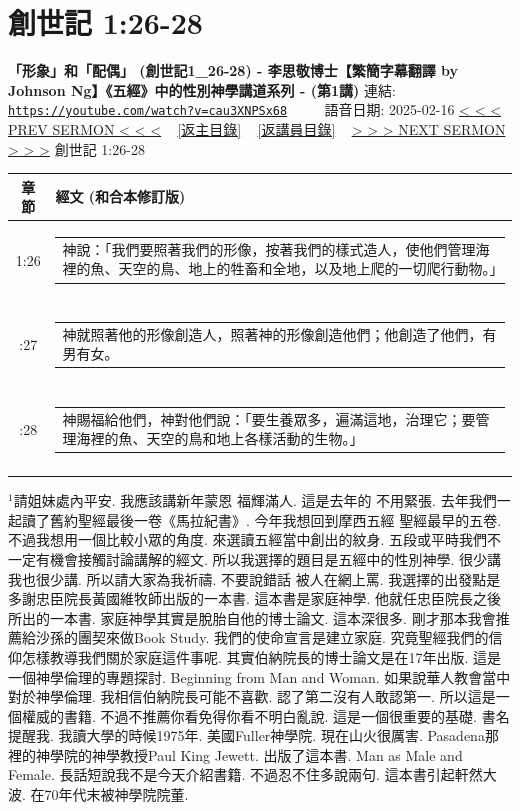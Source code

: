 \documentclass{book}
\begin{document}
\section{創世記 1:26-28}
\label{sec:cau3XNPSx68}
\textbf{「形象」和「配偶」 (創世記1\_26-28) - 李思敬博士【繁簡字幕翻譯 by Johnson Ng】《五經》中的性別神學講道系列 - (第1講)}
\newline
\newline
連結: \href{https://youtube.com/watch?v=cau3XNPSx68}{\texttt{https://youtube.com/watch?v=cau3XNPSx68}} ~~~~ 語音日期: 2025-02-16
\newline
\newline
\hyperref[sec:l7wNnYvML2Y]{< < < PREV SERMON < < <}
~
\hyperlink{toc}{[返主目錄]}
~
\hyperref[ch:preacher5]{[返講員目錄]}
~
\hyperref[sec:dX_CJYSfYFI]{> > > NEXT SERMON > > >}
\newline
\newline
創世記 1:26-28
\newline
\begin{longtable}{cl}
\hline
\hline
章節 & 經文 (和合本修訂版)\\
\hline
1:26 & \begin{tabularx}{0.7\textwidth}{X} 神說：「我們要照著我們的形像，按著我們的樣式造人，使他們管理海裡的魚、天空的鳥、地上的牲畜和全地，以及地上爬的一切爬行動物。」 \end{tabularx} \\ \\ \relax
1:27 & \begin{tabularx}{0.7\textwidth}{X} 神就照著他的形像創造人，照著神的形像創造他們；他創造了他們，有男有女。 \end{tabularx} \\ \\ \relax
1:28 & \begin{tabularx}{0.7\textwidth}{X} 神賜福給他們，神對他們說：「要生養眾多，遍滿這地，治理它；要管理海裡的魚、天空的鳥和地上各樣活動的生物。」 \end{tabularx} \\ \\
[1ex]
\hline
\hline
\end{longtable}
$^{1}$請姐妹處內平安.
我應該講新年蒙恩 福輝滿人.
這是去年的 不用緊張.
去年我們一起讀了舊約聖經最後一卷《馬拉紀書》.
今年我想回到摩西五經 聖經最早的五卷.
不過我想用一個比較小眾的角度.
來選讀五經當中創出的紋身.
五段或平時我們不一定有機會接觸討論講解的經文.
所以我選擇的題目是五經中的性別神學.
很少講 我也很少講.
所以請大家為我祈禱.
不要說錯話 被人在網上罵.
我選擇的出發點是多謝忠臣院長黃國維牧師出版的一本書.
這本書是家庭神學.
他就任忠臣院長之後所出的一本書.
家庭神學其實是脫胎自他的博士論文.
這本深很多.
剛才那本我會推薦給沙孫的團契來做Book Study.
我們的使命宣言是建立家庭.
究竟聖經我們的信仰怎樣教導我們關於家庭這件事呢.
其實伯納院長的博士論文是在17年出版.
這是一個神學倫理的專題探討.
Beginning from Man and Woman.
如果說華人教會當中對於神學倫理.
我相信伯納院長可能不喜歡.
認了第二沒有人敢認第一.
所以這是一個權威的書籍.
不過不推薦你看免得你看不明白亂說.
這是一個很重要的基礎.
書名提醒我.
我讀大學的時候1975年.
美國Fuller神學院.
現在山火很厲害.
Pasadena那裡的神學院的神學教授Paul King Jewett.
出版了這本書.
Man as Male and Female.
長話短說我不是今天介紹書籍.
不過忍不住多說兩句.
這本書引起軒然大波.
在70年代末被神學院院董.
\end{document}

